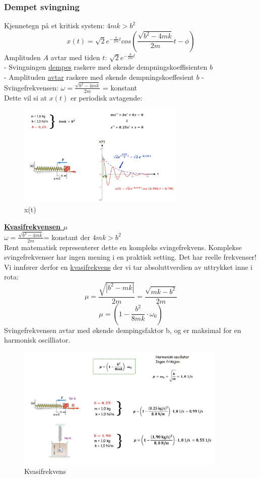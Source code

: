 \documentclass[12pt]{article}
\begin{document}
\subsubsection{Dempet svingning}
Kjennetegn på et kritisk system: $4mk > b^2$
$$x(t) = \sqrt{2}e^{-\frac{b}{2m}t} cos \left( \frac{\sqrt{b^2-4mk}}{2m}t-\phi  \right)$$
Amplituden $A$ avtar med tiden $t$: $\sqrt{2}e^{-\frac{b}{2m}t}$\\
- Svingningen \underline{dempes} raskere med økende dempningskoeffisienten $b$\\
- Amplituden \underline{avtar} raskere med økende dempningskoeffesient $b$
- Svingefrekvensen: $\omega = \frac{\sqrt{b^2-4mk}}{2m}$ = konstant\\
Dette vil si at $x(t)$ er periodisk avtagende:
\begin{figure} [H]
    \centering
    \includegraphics[width = 8cm]{images/slow3.png}
    \caption{x(t)}
\end{figure}
\bigskip
\textbf{\underline{Kvasifrekvensen $\mu$}}\\
\bigskip
$\omega = \frac{\sqrt{b^2-4mk}}{2m}$= konstant der $4mk > b^2$\\
Rent matematisk representerer dette en kompleks svingefrekvens. Komplekse svingefrekvenser har ingen mening i en praktisk setting. Det har reelle frekvenser!\\
\bigskip
Vi innfører derfor en \underline{kvasifrekvens} der vi tar absoluttverdien av uttrykket inne i rota:
$$\mu = \frac{\sqrt{|b^2-mk|}}{2m} = \frac{\sqrt{mk-b^2}}{2m}$$
$$\mu = \left(1-\frac{b^2}{8mk}\cdot \omega_0 \right)$$
Svingefrekvensen avtar med økende dempingsfaktor b, og er maksimal for en harmonisk oscilliator.
\begin{figure} [H]
    \centering
    \includegraphics[width = 10cm]{images/slow4.png}
    \caption{Kvasifrekvens}
\end{figure}
\pagebreak
\end{document}
